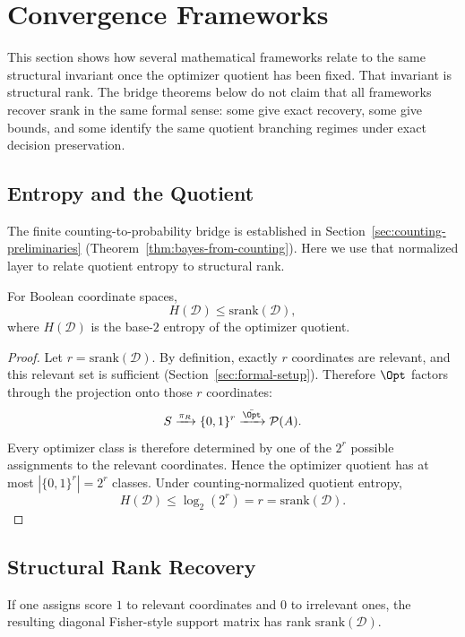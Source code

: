 \section{Convergence Frameworks}\label{sec:convergence-frameworks}

This section shows how several mathematical frameworks relate to the same structural invariant once the optimizer quotient has been fixed. That invariant is structural rank. The bridge theorems below do not claim that all frameworks recover $\mathrm{srank}$ in the same formal sense: some give exact recovery, some give bounds, and some identify the same quotient branching regimes under exact decision preservation.

\subsection{Entropy and the Quotient}

The finite counting-to-probability bridge is established in Section~\ref{sec:counting-preliminaries} (Theorem~\ref{thm:bayes-from-counting}). Here we use that normalized layer to relate quotient entropy to structural rank.

\begin{theorem}\label{thm:entropy-rank}
For Boolean coordinate spaces,
\[
H(\mathcal{D}) \le \mathrm{srank}(\mathcal{D}),
\]
where $H(\mathcal{D})$ is the base-$2$ entropy of the optimizer quotient.
\end{theorem}

\begin{proof}
Let $r=\mathrm{srank}(\mathcal{D})$. By definition, exactly $r$ coordinates are relevant, and this relevant set is sufficient (Section~\ref{sec:formal-setup}). Therefore $\Opt$ factors through the projection onto those $r$ coordinates:
\[
S \xrightarrow{\pi_R} \{0,1\}^r \xrightarrow{\bar{\Opt}} \mathcal{P}(A).
\]
Every optimizer class is therefore determined by one of the $2^r$ possible assignments to the relevant coordinates. Hence the optimizer quotient has at most $|\{0,1\}^r|=2^r$ classes. Under counting-normalized quotient entropy,
\[
H(\mathcal{D}) \le \log_2(2^r)=r=\mathrm{srank}(\mathcal{D}).
\]
\end{proof}

\subsection{Structural Rank Recovery}

\begin{theorem}\label{thm:fisher-rank-srank}
If one assigns score $1$ to relevant coordinates and $0$ to irrelevant ones, the resulting diagonal Fisher-style support matrix has rank $\mathrm{srank}(\mathcal{D})$.
\end{theorem}

